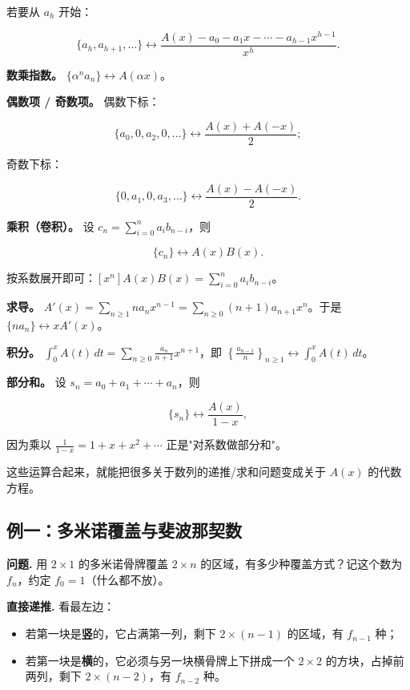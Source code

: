 若要从 $a_h$ 开始：

\[
\{a_h,a_{h+1},\dots\}\longleftrightarrow \frac{A(x)-a_0-a_1x-\cdots-a_{h-1}x^{h-1}}{x^h}.
\]

\textbf{数乘指数。} $\{\alpha^na_n\}\longleftrightarrow A(\alpha x)$。

\textbf{偶数项 / 奇数项。} 偶数下标：

\[
\{a_0,0,a_2,0,\dots\}\longleftrightarrow \frac{A(x)+A(-x)}{2};
\]

奇数下标：

\[
\{0,a_1,0,a_3,\dots\}\longleftrightarrow \frac{A(x)-A(-x)}{2}.
\]

\textbf{乘积（卷积）。} 设 $c_n=\sum_{i=0}^{n}a_ib_{n-i}$，则

\[
\{c_n\}\longleftrightarrow A(x)B(x).
\]

按系数展开即可：$[x^n]A(x)B(x)=\sum_{i=0}^na_ib_{n-i}$。

\textbf{求导。} $A'(x)=\sum_{n\ge1}na_nx^{n-1}=\sum_{n\ge0}(n+1)a_{n+1}x^n$。于是 $\{na_n\}\longleftrightarrow xA'(x)$。

\textbf{积分。} $\displaystyle\int_0^xA(t)\,dt=\sum_{n\ge0}\frac{a_n}{n+1}x^{n+1}$，即 $\left\{\frac{a_{n-1}}{n}\right\}_{n\ge1}\longleftrightarrow \displaystyle\int_0^xA(t)\,dt$。

\textbf{部分和。} 设 $s_n=a_0+a_1+\cdots+a_n$，则

\[
\{s_n\}\longleftrightarrow \frac{A(x)}{1-x},
\]

因为乘以 $\frac1{1-x}=1+x+x^2+\cdots$ 正是"对系数做部分和"。

这些运算合起来，就能把很多关于数列的递推/求和问题变成关于 $A(x)$ 的代数方程。

\subsection{例一：多米诺覆盖与斐波那契数}


\textbf{问题.} 用 $2\times1$ 的多米诺骨牌覆盖 $2\times n$ 的区域，有多少种覆盖方式？记这个数为 $f_n$，约定 $f_0=1$（什么都不放）。

\textbf{直接递推.} 看最左边：

\begin{itemize}
\item 若第一块是\textbf{竖}的，它占满第一列，剩下 $2\times(n-1)$ 的区域，有 $f_{n-1}$ 种；
\item 若第一块是\textbf{横}的，它必须与另一块横骨牌上下拼成一个 $2\times2$ 的方块，占掉前两列，剩下 $2\times(n-2)$，有 $f_{n-2}$ 种。
\end{itemize}


